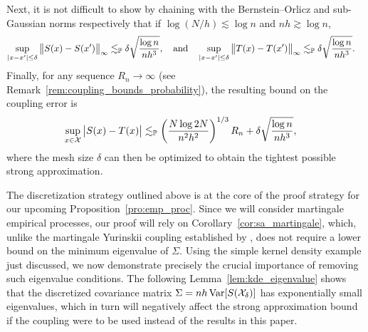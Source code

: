 Next, it is not difficult to show by chaining with the Bernstein--Orlicz and
sub-Gaussian norms respectively \citep[Section~2.2]{van1996weak} that if
$\log(N/h) \lesssim \log n$ and $n h \gtrsim \log n$,
%
\begin{align*}
  \sup_{|x-x'| \leq \delta}
  \big\|S(x) - S(x') \big\|_\infty
  &\lesssim_\P
  \delta
  \sqrt{\frac{\log n}{n h^3}}, \quad\text{and}\quad
  \sup_{|x-x'| \leq \delta}
  \big\|T(x) - T(x')\big\|_\infty
  \lesssim_\P
  \delta
  \sqrt{\frac{\log n}{n h^3}}.
\end{align*}
%
Finally, for any sequence $R_n\to\infty$
(see Remark~\ref{rem:coupling_bounds_probability}),
the resulting bound on the coupling error is
%
\begin{align*}
  \sup_{x \in \cX}
  \big| S(x) - T(x) \big|
  &\lesssim_\P
  \left( \frac{N \log 2N}{n^2 h^2} \right)^{1/3} R_n
  + \delta \sqrt{\frac{\log n}{n h^3}},
\end{align*}
%
where the mesh size $\delta$ can then be optimized to obtain the tightest
possible strong
approximation.

The discretization strategy outlined above is at the core of the proof strategy
for our upcoming Proposition~\ref{pro:emp_proc}. Since we will consider
martingale empirical processes, our proof will rely on
Corollary~\ref{cor:sa_martingale}, which, unlike the martingale Yurinskii
coupling established by \citet{li2020uniform}, does not require a lower bound
on the minimum eigenvalue of $\Sigma$. Using the simple kernel density example
just discussed, we now demonstrate precisely the crucial importance of removing
such eigenvalue conditions. The following Lemma~\ref{lem:kde_eigenvalue} shows
that the discretized covariance matrix $\Sigma = n h\Var[S(\cX_\delta)]$ has
exponentially small eigenvalues, which in turn will negatively affect the
strong approximation bound if the \citet{li2020uniform} coupling were to be
used instead of the results in this paper.


